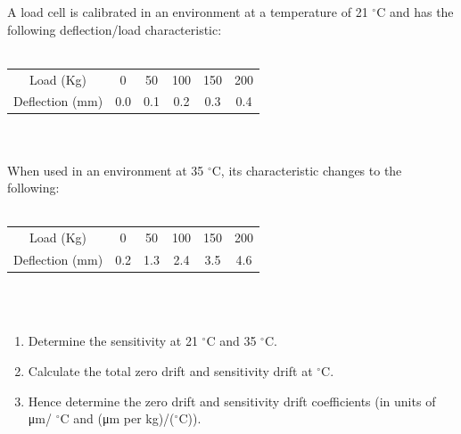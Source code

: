 \documentclass[a4paper,11pt]{book}
\begin{document}
\begin{question}
A load cell is calibrated in an environment at a temperature of 21 $^{\circ}$C and has the following
deflection/load characteristic: \\ \\

\begin{tabular}{cccccc}
\hline 
Load (Kg) & 0 & 50 & 100 & 150 & 200 \\ 
Deflection (mm) & 0.0 & 0.1 & 0.2 & 0.3 & 0.4 \\ 
\hline 
\end{tabular}  \\ \\

When used in an environment at 35 $^{\circ}$C, its characteristic changes to the following: \\ \\

\begin{tabular}{cccccc}
\hline 
Load (Kg) & 0 & 50 & 100 & 150 & 200 \\ 
Deflection (mm) & 0.2 & 1.3 & 2.4 & 3.5 & 4.6 \\ 
\hline 
\end{tabular} \\ \\

\begin{enumerate}
\item Determine the sensitivity at 21 $^{\circ}$C and 35 $^{\circ}$C.
\item Calculate the total zero drift and sensitivity drift at $^{\circ}$C.
\item Hence determine the zero drift and sensitivity drift coefficients (in units of μm/ $^{\circ}$C and
(μm per kg)/($^{\circ}$C)).
\end{enumerate}

\examspace*{5em}

\end{question}
\begin{solution}


\end{solution}
\end{document}

